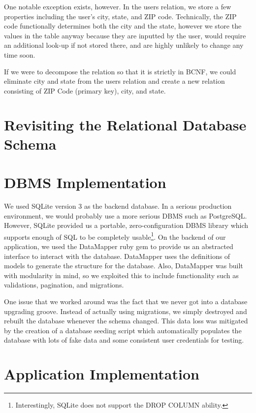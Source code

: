 \documentclass{acm_proc_article-sp}
\begin{document}
One notable exception exists, however. In the users relation, we store a few properties including the user's city, state, and ZIP code. 
Technically, the ZIP code functionally determines both the city and the state, however we store the values in the table
anyway because they are inputted by the user, would require an additional look-up if not stored there, and are highly unlikely
to change any time soon. 

If we were to decompose the relation so that it is strictly in BCNF, we could eliminate city and state from the users
relation and create a new relation consisting of ZIP Code (primary key), city, and state.
\section{Revisiting the Relational Database Schema}
\section{DBMS Implementation}
We used SQLite version 3 as the backend database. In a serious production environment, we would probably use
a more serious DBMS such as PostgreSQL. However, SQLite provided us a portable, zero-configuration DBMS library
which supports enough of SQL to be completely usable\footnote{Interestingly, SQLite does not support the DROP COLUMN ability.}.
On the backend of our application, we used the DataMapper ruby gem to provide us an abstracted interface to
interact with the database. DataMapper uses the definitions of models to generate the structure for the database.
Also, DataMapper was built with modularity in mind, so we exploited this to include functionality such as validations,
pagination, and migrations.

One issue that we worked around was the fact that we never got into a database upgrading groove. Instead of actually
using migrations, we simply destroyed and rebuilt the database whenever the schema changed. This data loss was mitigated
by the creation of a database seeding script which automatically populates the database with lots of fake data and some
consistent user credentials for testing.

\section{Application Implementation}
\end{document}
